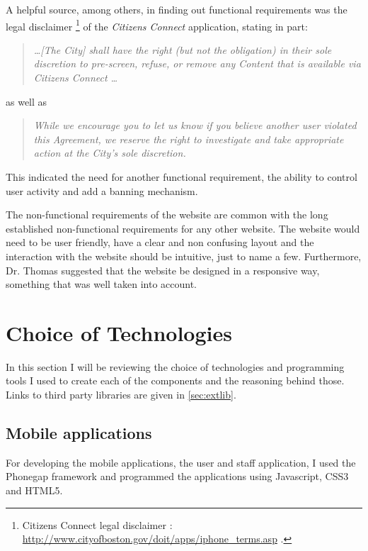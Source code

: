 \documentclass[12pt]{ecsproject}     %
\begin{document}
A helpful source, among others, in finding out functional requirements was the legal disclaimer
\footnote{ Citizens Connect legal disclaimer :
 \href{http://www.cityofboston.gov/doit/apps/iphone_terms.asp}{http://www.cityofboston.gov/doit/apps/iphone\_terms.asp} .} of the \emph{Citizens Connect} application, stating in part:

\begin{quotation}
\emph{ \dots [The City] shall have the right (but not the obligation) in their sole discretion to pre-screen, refuse, or remove any Content that is available via Citizens Connect \dots }
\end{quotation}

as well as 

\begin{quotation}\emph{
While we encourage you to let us know if you believe another user violated this Agreement, we reserve the right to investigate and take appropriate action at the City's sole discretion. 
}\end{quotation}

This indicated the need for another functional requirement, the ability to control user activity and add a banning mechanism.

The non-functional requirements of the website are common with the long established non-functional requirements for any other website. The website would need to be user friendly, have a clear and non confusing layout and the interaction with the website should be intuitive, just to name a few. Furthermore, Dr. Thomas suggested that the website be designed in a responsive way, something that was well taken into account. 

\section{Choice of Technologies}
In this section I will be reviewing the choice of technologies and programming tools I used to create each of the components and the reasoning behind those. Links to third party libraries are given in \ref{sec:extlib}.

\subsection{Mobile applications}
For developing the mobile applications, the user and staff application, I used the Phonegap framework and programmed the applications using Javascript, CSS3 and HTML5.
\end{document}
